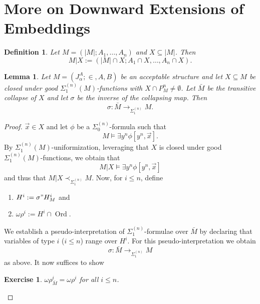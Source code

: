 \documentclass[12pt,a4paper]{article}
\theoremstyle{nicestyle}
\newtheorem{exercise}{Exercise}[subsection]
\newtheorem{definition}{Definition}[subsection]
\newtheorem{lemma}{Lemma}[subsection]
\DeclareMathOperator{\ord}{Ord}
\begin{document}
    \section{More on Downward Extensions of Embeddings}
    
    \begin{definition}
      Let $M = (|M|; A_{1}, \ldots, A_{n})$ and $X \subseteq |M|$. Then
      \[
	M | X := (|M| \cap X; A_{1} \cap X, \ldots, A_{n} \cap X).
      \]
    \end{definition}

    \begin{lemma}
      Let $M = (J^{A}_{\alpha}; \in, A, B)$ be an acceptable structure
      and let $X \subseteq M$ be closed under good
      $\Sigma^{(n)}_{1}(M)$-functions with
      $X \cap P^{n}_{M} \neq \emptyset$. Let $\bar{M}$ be the
      transitive collapse of $X$ and let $\sigma$ be the inverse of
      the collapsing map. Then
      \[
	\sigma \colon \bar{M} \to_{\Sigma^{(n)}_{1}} M.
      \]
    \end{lemma}

    \begin{proof}
      $\vec{x} \in X$ and let $\phi$ be a $\Sigma^{(n)}_{0}$-formula
      such that
      \[
	M \models \exists y^{n} \phi[y^{n}, \vec{x}].
      \]
      By $\Sigma^{(n)}_{1}(M)$-uniformization, leveraging that $X$ is
      closed under good $\Sigma^{(n)}_{1}(M)$-functions, we obtain
      that
      \[
	M | X \models \exists y^{n} \phi[y^{n}, \vec{x}]
      \]
      and thus that $M | X \prec_{\Sigma^{(n)}_{1}} M$. Now, for
      $i \le n$, define
      \begin{enumerate}
      \item $H^{i} := \sigma " H^{i}_{M}$ and
      \item $\omega\rho^{i} := H^{i} \cap \ord$.
      \end{enumerate}
      We establish a pseudo-interpretation of
      $\Sigma^{(n)}_{1}$-formulae over $\bar{M}$ by declaring that
      variables of type $i$ ($i \le n$) range over $H^{i}$. For this
      pseudo-interpretation we obtain
      \[
	\sigma \colon \bar{M} \to_{\Sigma^{(n)}_{1}} M
      \]
      as above. It now suffices to show
      \begin{exercise}
        $\omega\rho^{i}_{\bar{M}} = \omega\rho^{i}$ for all $i \le n$.
      \end{exercise}
      
    \end{proof}
\end{document}
